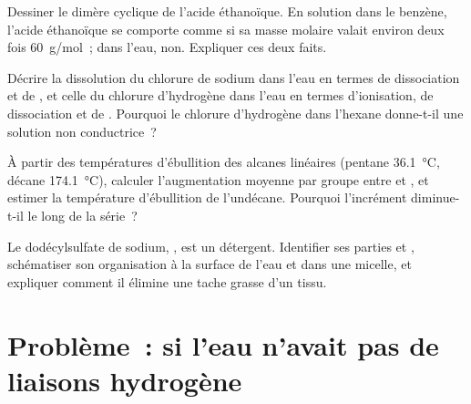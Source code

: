 \begin{exercise}[$\star\star$]\label{exo:b1:intermolecular-forces-solvents:9}
Dessiner le dimère cyclique de l'acide éthanoïque. En solution dans le
benzène, l'acide éthanoïque se comporte comme si sa masse molaire valait
environ deux fois \qty{60}{g/mol}~; dans l'eau, non. Expliquer ces deux
faits.
\end{exercise}

\begin{exercise}[$\star\star\star$]\label{exo:b1:intermolecular-forces-solvents:10}
Décrire la dissolution du chlorure de sodium dans l'eau en termes de
dissociation et de , et celle du chlorure d'hydrogène dans
l'eau en termes d'ionisation, de dissociation et de . Pourquoi
le chlorure d'hydrogène dans l'hexane donne-t-il une solution non
conductrice~?
\end{exercise}

\begin{exercise}[$\star\star\star$]\label{exo:b1:intermolecular-forces-solvents:11}
À partir des températures d'ébullition des alcanes linéaires (pentane
\qty{36.1}{\celsius}, décane \qty{174.1}{\celsius}), calculer
l'augmentation moyenne par groupe  entre  et , et
estimer la température d'ébullition de l'undécane. Pourquoi l'incrément
diminue-t-il le long de la série~?
\end{exercise}

\begin{exercise}[$\star\star\star$]\label{exo:b1:intermolecular-forces-solvents:12}
Le dodécylsulfate de sodium, , est un
détergent. Identifier ses parties  et , schématiser
son organisation à la surface de l'eau et dans une micelle, et expliquer
comment il élimine une tache grasse d'un tissu.
\end{exercise}

\section{Problème~: si l'eau n'avait pas de liaisons hydrogène}

